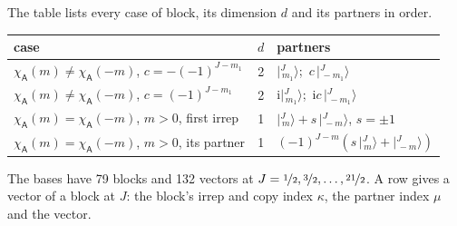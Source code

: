 \documentclass[10pt,a4paper]{article}
\numberwithin{equation}{section}
\newcommand{\grp}[1]{\mathsf{#1}}
\newcommand{\iunit}{\mathrm{i}}
\newcommand{\chiA}{\chi_{\grp{A}}}
\newcommand{\mult}{\kappa}
\newcommand{\intx}{\mu}
\newcommand{\jm}[2]{\bigl\lvert{}^{#1}_{\,#2}\bigr\rangle}
\begin{document}
\leavevmode\label{n:head.case}\label{n:head.partners}The table lists every case of block, its dimension $d$ and its partners in order.
\begin{center}\begin{tabular}{@{}lrl@{}}\toprule
case & $d$ & partners\\\midrule
$\chiA(m) \ne \chiA(-m)$, $c = -(-1)^{J-m_1}$ & 2 & $\jm{J}{m_1}$;\ $c\,\jm{J}{-m_1}$\\
$\chiA(m) \ne \chiA(-m)$, $c = (-1)^{J-m_1}$ & 2 & $\iunit\jm{J}{m_1}$;\ $\iunit c\,\jm{J}{-m_1}$\\
$\chiA(m) = \chiA(-m)$, $m > 0$, first irrep & 1 & $\jm{J}{m} + s\,\jm{J}{-m}$, $s = \pm1$\\
$\chiA(m) = \chiA(-m)$, $m > 0$, its partner & 1 & $(-1)^{J-m}(s\,\jm{J}{m} + \jm{J}{-m})$\\
\bottomrule\end{tabular}\end{center}
The bases have 79 blocks and 132 vectors at $J = \nicefrac{1}{2}, \nicefrac{3}{2}, \dots, \nicefrac{21}{2}$. \label{n:head.vector}A row gives a vector of a block at $J$: the block's irrep and copy index $\mult$, the partner index $\intx$ and the vector.
\end{document}
